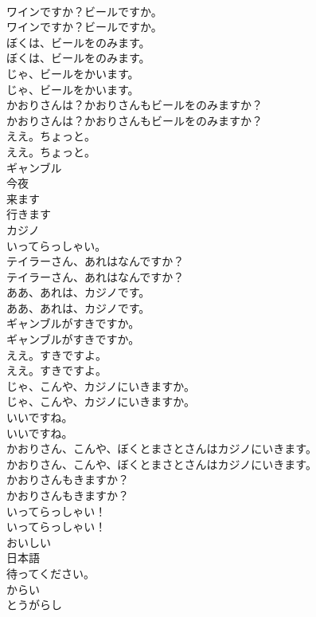 \documentclass[8pt]{extreport}
\begin{document}
\begin{CJK}{UTF8}{min}
\\	ワインですか？ビールですか。	
\\	ワインですか？ビールですか。 
\\	ぼくは、ビールをのみます。	
\\	ぼくは、ビールをのみます。 
\\	じゃ、ビールをかいます。	
\\	じゃ、ビールをかいます。 
\\	かおりさんは？かおりさんもビールをのみますか？	
\\	かおりさんは？かおりさんもビールをのみますか？ 
\\	ええ。ちょっと。	
\\	ええ。ちょっと。 
\\	ギャンブル
\\	今夜
\\	来ます
\\	行きます
\\	カジノ
\\	いってらっしゃい。
\\	テイラーさん、あれはなんですか？	
\\	テイラーさん、あれはなんですか？ 
\\	ああ、あれは、カジノです。	
\\	ああ、あれは、カジノです。 
\\	ギャンブルがすきですか。	
\\	ギャンブルがすきですか。 
\\	ええ。すきですよ。	
\\	ええ。すきですよ。 
\\	じゃ、こんや、カジノにいきますか。	
\\	じゃ、こんや、カジノにいきますか。 
\\	いいですね。	
\\	いいですね。 
\\	かおりさん、こんや、ぼくとまさとさんはカジノにいきます。	
\\	かおりさん、こんや、ぼくとまさとさんはカジノにいきます。 
\\	かおりさんもきますか？	
\\	かおりさんもきますか？ 
\\	いってらっしゃい！	
\\	いってらっしゃい！ 
\\	おいしい
\\	日本語
\\	待ってください。
\\	からい
\\	とうがらし

\end{CJK}
\end{document}
